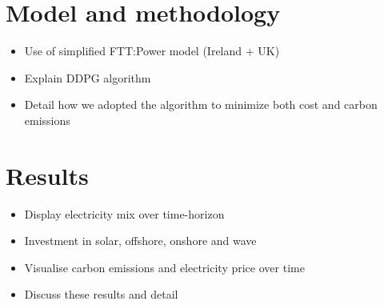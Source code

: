 \documentclass{article}
\begin{document}
\section{Model and methodology}
\label{sec:methods}

\begin{itemize}
	\item Use of simplified FTT:Power model (Ireland + UK)
	\item Explain DDPG algorithm
	\item Detail how we adopted the algorithm to minimize both cost and carbon emissions
\end{itemize}



\section{Results}
\label{sec:results}

\begin{itemize}
	\item Display electricity mix over time-horizon
	\item Investment in solar, offshore, onshore and wave
	\item Visualise carbon emissions and electricity price over time
	\item Discuss these results and detail 
\end{itemize}





\end{document}
